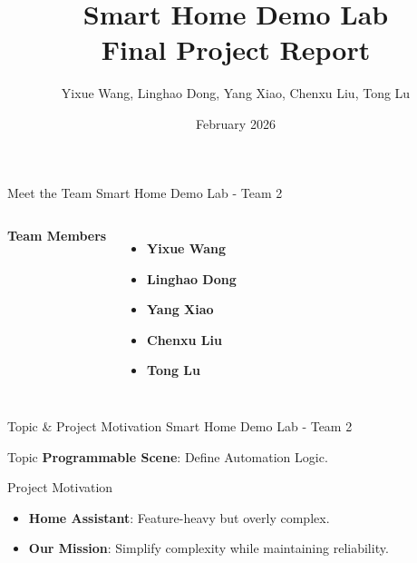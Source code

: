 \documentclass[aspectratio=169, 10pt, xcolor=table]{beamer}
\title[Smart Home Demo Lab]{Smart Home Demo Lab\\Final Project Report}
\author[Team 2]{Yixue Wang, Linghao Dong, Yang Xiao, Chenxu Liu, Tong Lu}
\institute{Freie Universität Berlin}
\date{February 2026}
\begin{document}
\begin{frame}
    \titlepage
\end{frame}

\begin{frame}{Meet the Team}
    {Smart Home Demo Lab - Team 2}
    
    \begin{columns}[c]
            \centering
            \textbf{\Large Team Members}
            \vspace{1em}
            
            \begin{itemize}[<+->]
                \item \textbf{Yixue Wang}
                \item \textbf{Linghao Dong}
                \item \textbf{Yang Xiao}
                \item \textbf{Chenxu Liu}
                \item \textbf{Tong Lu}
            \end{itemize}

            \centering
    \end{columns}
\end{frame}

\begin{frame}{Topic \& Project Motivation}
    {Smart Home Demo Lab - Team 2}

    \begin{block}{Topic}
        \textbf{Programmable Scene}: Define Automation Logic.
    \end{block}
    
    \pause
    \vspace{1em}
    
    \begin{block}{Project Motivation}
        \begin{itemize}[<+->]
            \item \textbf{Home Assistant}: Feature-heavy but overly complex.
            \item \textbf{Our Mission}: Simplify complexity while maintaining reliability.
        \end{itemize}
    \end{block}
\end{frame}
\end{document}
